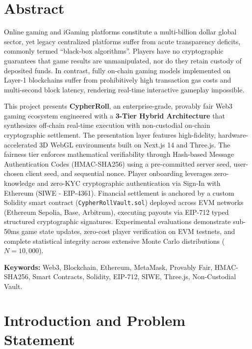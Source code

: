 \section{Abstract}

Online gaming and iGaming platforms constitute a multi-billion dollar global sector, yet legacy centralized platforms suffer from acute transparency deficits, commonly termed ``black-box algorithms''. Players have no cryptographic guarantees that game results are unmanipulated, nor do they retain custody of deposited funds. In contrast, fully on-chain gaming models implemented on Layer-1 blockchains suffer from prohibitively high transaction gas costs and multi-second block latency, rendering real-time interactive gameplay impossible.

This project presents \textbf{CypherRoll}, an enterprise-grade, provably fair Web3 gaming ecosystem engineered with a \textbf{3-Tier Hybrid Architecture} that synthesizes off-chain real-time execution with non-custodial on-chain cryptographic settlement. The presentation layer features high-fidelity, hardware-accelerated 3D WebGL environments built on Next.js 14 and Three.js. The fairness tier enforces mathematical verifiability through Hash-based Message Authentication Codes (HMAC-SHA256) using a pre-committed server seed, user-chosen client seed, and sequential nonce. Player onboarding leverages zero-knowledge and zero-KYC cryptographic authentication via Sign-In with Ethereum (SIWE - EIP-4361). Financial settlement is anchored by a custom Solidity smart contract (\texttt{CypherRollVault.sol}) deployed across EVM networks (Ethereum Sepolia, Base, Arbitrum), executing payouts via EIP-712 typed structured cryptographic signatures. Experimental evaluations demonstrate sub-50ms game state updates, zero-cost player verification on EVM testnets, and complete statistical integrity across extensive Monte Carlo distributions ($N = 10,000$).

\vspace{0.5cm}
\noindent\textbf{Keywords:} Web3, Blockchain, Ethereum, MetaMask, Provably Fair, HMAC-SHA256, Smart Contracts, Solidity, EIP-712, SIWE, Three.js, Non-Custodial Vault.

\newpage

\section{Introduction and Problem Statement}

